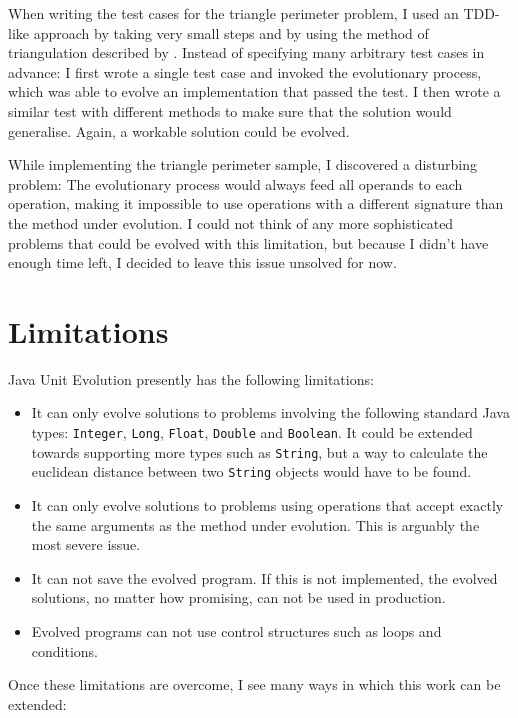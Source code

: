 \documentclass[a4paper]{article}
\begin{document}
When writing the test cases for the triangle perimeter problem, I used
an TDD-like approach by taking very small steps and by using the
method of triangulation described by \cite{beck2002}. Instead of
specifying many arbitrary test cases in advance: I first wrote a
single test case and invoked the evolutionary process, which was able
to evolve an implementation that passed the test. I then wrote a
similar test with different methods to make sure that the solution
would generalise. Again, a workable solution could be evolved.

While implementing the triangle perimeter sample, I discovered a
disturbing problem: The evolutionary process would always feed all
operands to each operation, making it impossible to use operations
with a different signature than the method under evolution. I could
not think of any more sophisticated problems that could be evolved
with this limitation, but because I didn't have enough time
left, I decided to leave this issue unsolved for now.

\section{Limitations}

Java Unit Evolution presently has the following limitations:

\begin{itemize}
\item It can only evolve solutions to problems involving the following
  standard Java types: \verb!Integer!, \verb!Long!, \verb!Float!,
  \verb!Double! and \verb!Boolean!. It could be extended towards
  supporting more types such as \verb!String!, but a way to calculate
  the euclidean distance between two \verb!String! objects would have
  to be found.
\item It can only evolve solutions to problems using operations that
  accept exactly the same arguments as the method under
  evolution. This is arguably the most severe issue.
\item It can not save the evolved program. If this is not implemented,
  the evolved solutions, no matter how promising, can not be used in
  production.
\item Evolved programs can not use control structures such as loops
  and conditions.
\end{itemize}

Once these limitations are overcome, I see many ways in which this
work can be extended:
\end{document}
